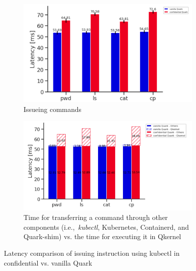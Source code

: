 \begin{figure}[!htb] 
    \begin{subfigure}[b]{0.5\linewidth}
      \centering
      \includegraphics[width=1\textwidth]{images/speed_of_issuing_cmd_in_cquark_upstream_quark.PNG} %
      \caption{Issueing commands}
      \label{fig:speed_of_issuing_cmd_in_cquark_upstream_quark}
      \vspace{4ex}
    \end{subfigure}%
    \begin{subfigure}[b]{0.5\linewidth}
      \centering
      \includegraphics[width=1\textwidth]{images/timeshare_issuing_cmd_in_cquark_upstream_quark_kubectl.png} %
        \caption{Time for transferring a command through other components (i.e.,~\emph{kubectl}, Kubernetes, Containerd, and Quark-shim) vs. the time for executing it in Qkernel}
        \label{fig:timeshare_issuing_cmd_in_cquark_upstream_quark_kubectl}
      \vspace{4ex}
    \end{subfigure} 
    \caption{Latency comparison of issuing instruction using kubectl in confidential vs. vanilla Quark}
    \label{fig8} 
\end{figure}


